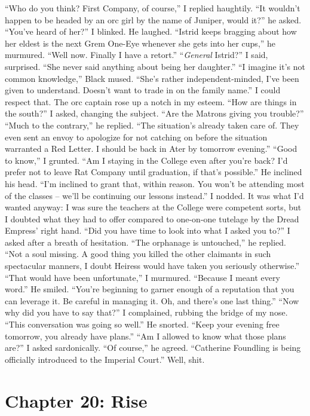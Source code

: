 \documentclass[12pt, openany]{book}
\begin{document}
“Who do you think? First Company, of course,” I replied haughtily.
“It wouldn’t happen to be headed by an orc girl by the name of Juniper, would it?” he asked.
“You’ve heard of her?” I blinked.
He laughed.
“Istrid keeps bragging about how her eldest is the next Grem One-Eye whenever she gets into her cups,” he murmured. “Well now. Finally I have a retort.”
“\textit{General} Istrid?” I said, surprised. “She never said anything about being her daughter.”
“I imagine it’s not common knowledge,” Black mused. “She’s rather independent-minded, I’ve been given to understand. Doesn’t want to trade in on the family name.”
I could respect that. The orc captain rose up a notch in my esteem.
“How are things in the south?” I asked, changing the subject. “Are the Matrons giving you trouble?”
“Much to the contrary,” he replied. “The situation’s already taken care of. They even sent an envoy to apologize for not catching on before the situation warranted a Red Letter. I should be back in Ater by tomorrow evening.”
“Good to know,” I grunted. “Am I staying in the College even after you’re back? I’d prefer not to leave Rat Company until graduation, if that’s possible.”
He inclined his head. “I’m inclined to grant that, within reason. You won’t be attending most of the classes – we’ll be continuing our lessons instead.”
I nodded. It was what I’d wanted anyway: I was sure the teachers at the College were competent sorts, but I doubted what they had to offer compared to one-on-one tutelage by the Dread Empress’ right hand.
“Did you have time to look into what I asked you to?” I asked after a breath of hesitation.
“The orphanage is untouched,” he replied. “Not a soul missing. A good thing you killed the other claimants in such spectacular manners, I doubt Heiress would have taken you seriously otherwise.”
“That would have been unfortunate,” I murmured. “Because I meant every word.”
He smiled. “You’re beginning to garner enough of a reputation that you can leverage it. Be careful in managing it. Oh, and there’s one last thing.”
“Now why did you have to say that?” I complained, rubbing the bridge of my nose. “This conversation was going so well.”
He snorted. “Keep your evening free tomorrow, you already have plans.”
“Am I allowed to know what those plans are?” I asked sardonically.
“Of course,” he agreed. “Catherine Foundling is being officially introduced to the Imperial Court.”
Well, shit.
\clearpage
\chapter{Chapter 20: Rise}
\end{document}
